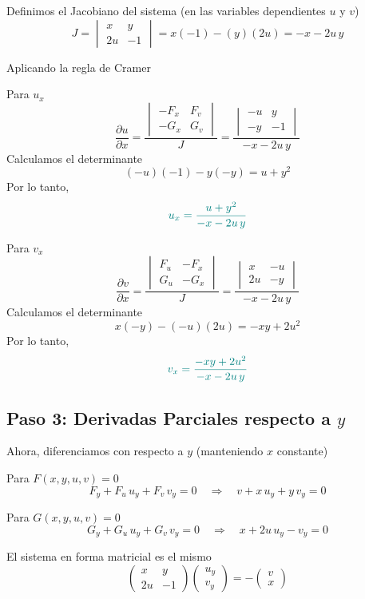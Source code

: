 \documentclass{article}
\begin{document}
Definimos el Jacobiano del sistema (en las variables dependientes \(u\) y \(v\))
\[
J = \begin{vmatrix} x & y \\[2mm] 2u & -1 \end{vmatrix} = x(-1) - (y)(2u) = -x - 2u\,y
\]

Aplicando la regla de Cramer

Para \( \displaystyle u_x\)
\[
\frac{\partial u}{\partial x} =
\frac{
\begin{vmatrix}
- F_x & F_v \\
- G_x & G_v
\end{vmatrix}
}{J}
=\frac{
\begin{vmatrix}
- u & y \\
- y & -1
\end{vmatrix}
}{-x - 2u\,y}
\]
Calculamos el determinante
\[
(-u)(-1) - y(-y) = u + y^2
\]
Por lo tanto,
\[\color{teal}
u_x = \frac{u + y^2}{-x - 2u\,y}
\]

Para \( \displaystyle v_x\)
\[
\frac{\partial v}{\partial x} =
\frac{
\begin{vmatrix}
F_u & - F_x \\
G_u & - G_x
\end{vmatrix}
}{J}
=\frac{
\begin{vmatrix}
x & - u \\
2u & - y
\end{vmatrix}
}{-x - 2u\,y}
\]
Calculamos el determinante
\[
x(-y) - (-u)(2u) = -xy + 2u^2
\]
Por lo tanto,
\[\color{teal}
v_x = \frac{-xy + 2u^2}{-x - 2u\,y}
\]

\subsection*{Paso 3: Derivadas Parciales respecto a \(y\)}

Ahora, diferenciamos con respecto a \(y\) (manteniendo \(x\) constante)

Para \(F(x,y,u,v)=0\)
\[
F_y + F_u\,u_y + F_v\,v_y = 0 \quad \Longrightarrow \quad v + x\,u_y + y\,v_y = 0
\]

Para \(G(x,y,u,v)=0\)
\[
G_y + G_u\,u_y + G_v\,v_y = 0 \quad \Longrightarrow \quad x + 2u\,u_y - v_y = 0
\]

El sistema en forma matricial es el mismo
\[
\begin{pmatrix}
x & y \\
2u & -1
\end{pmatrix}
\begin{pmatrix}
u_y \\[3mm] v_y
\end{pmatrix}
=
-\begin{pmatrix}
v \\[3mm] x
\end{pmatrix}
\]
\end{document}
